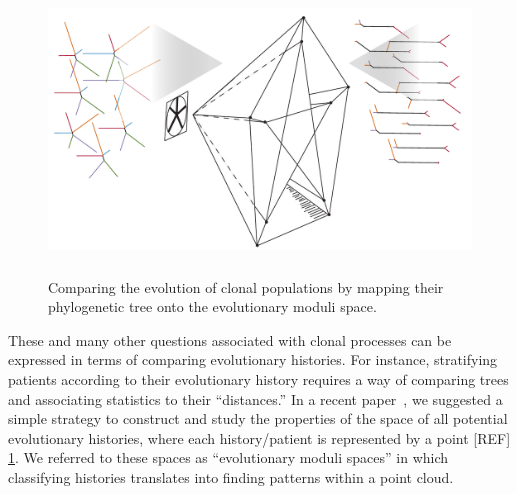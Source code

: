 \documentclass[a4paper,11pt]{article}
\begin{document}
\begin{figure}
    \centering
    \includegraphics[height=3in]{figures/cartoon_2.pdf}
    \caption{Comparing the evolution of clonal populations by mapping their phylogenetic tree onto the evolutionary moduli space.}
    \label{fig:cartoon_2}
\end{figure}

These and many other questions associated with clonal processes can be expressed in terms of comparing  evolutionary histories.
For instance, stratifying patients according to their evolutionary history requires a way of comparing trees and associating statistics to their ``distances.''
In a recent paper~\cite{zairis2014moduli}, we suggested a simple strategy to construct and study the properties of the space of all potential evolutionary histories, where each history/patient is represented by a point  [REF] \ref{fig:cartoon_2}. We referred to these spaces as  ``evolutionary moduli spaces'' in which classifying histories translates into finding patterns within a point cloud.
\end{document}
